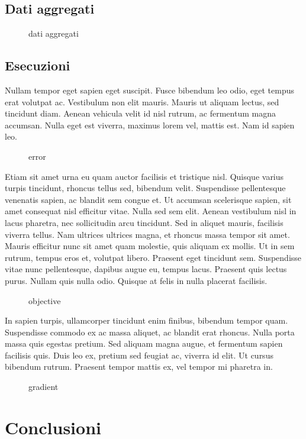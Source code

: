 \documentclass[a4paper]{article}
\begin{document}
\subsection{Dati aggregati}

\begin{figure}
    \begin{center}
        \scalebox{0.65}{}
    \end{center}
    \caption{dati aggregati}
\end{figure}

\subsection{Esecuzioni}

Nullam tempor eget sapien eget suscipit. Fusce bibendum leo odio, eget tempus erat volutpat ac. Vestibulum non elit mauris. Mauris ut aliquam lectus, sed tincidunt diam. Aenean vehicula velit id nisl rutrum, ac fermentum magna accumsan. Nulla eget est viverra, maximus lorem vel, mattis est. Nam id sapien leo.
\begin{figure}
    \begin{center}
        \scalebox{0.65}{}
    \end{center}
    \caption{error}
\end{figure}
Etiam sit amet urna eu quam auctor facilisis et tristique nisl. Quisque varius turpis tincidunt, rhoncus tellus sed, bibendum velit. Suspendisse pellentesque venenatis sapien, ac blandit sem congue et. Ut accumsan scelerisque sapien, sit amet consequat nisl efficitur vitae. Nulla sed sem elit. Aenean vestibulum nisl in lacus pharetra, nec sollicitudin arcu tincidunt. Sed in aliquet mauris, facilisis viverra tellus. Nam ultrices ultrices magna, et rhoncus massa tempor sit amet. Mauris efficitur nunc sit amet quam molestie, quis aliquam ex mollis. Ut in sem rutrum, tempus eros et, volutpat libero. Praesent eget tincidunt sem. Suspendisse vitae nunc pellentesque, dapibus augue eu, tempus lacus. Praesent quis lectus purus. Nullam quis nulla odio. Quisque at felis in nulla placerat facilisis.
\begin{figure}
    \begin{center}
        \scalebox{0.65}{}
    \end{center}
    \caption{objective}
\end{figure}
In sapien turpis, ullamcorper tincidunt enim finibus, bibendum tempor quam. Suspendisse commodo ex ac massa aliquet, ac blandit erat rhoncus. Nulla porta massa quis egestas pretium. Sed aliquam magna augue, et fermentum sapien facilisis quis. Duis leo ex, pretium sed feugiat ac, viverra id elit. Ut cursus bibendum rutrum. Praesent tempor mattis ex, vel tempor mi pharetra in.
\begin{figure}
    \begin{center}
        \scalebox{0.65}{}
    \end{center}
    \caption{gradient}
\end{figure}

\section{Conclusioni}
\end{document}

